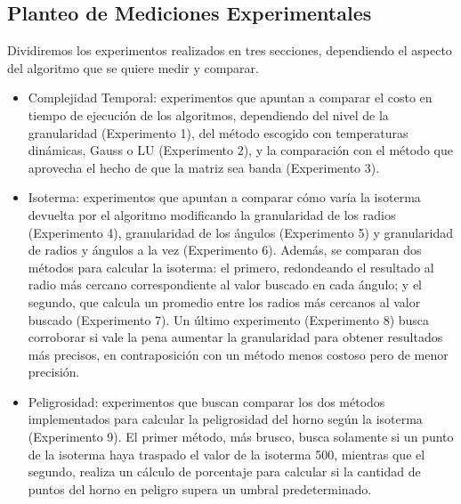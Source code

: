 \subsection{Planteo de Mediciones Experimentales}

\par Dividiremos los experimentos realizados en tres secciones, dependiendo el aspecto del algoritmo que se quiere medir y comparar.
\begin{itemize}


\item Complejidad Temporal: experimentos que apuntan a comparar el costo en tiempo de ejecución de los algoritmos, dependiendo del nivel de la granularidad (Experimento 1), del método escogido con temperaturas dinámicas, Gauss o LU (Experimento 2), y la comparación con el método que aprovecha el hecho de que la matriz sea banda (Experimento 3).
\item Isoterma: experimentos que apuntan a comparar cómo varía la isoterma devuelta por el algoritmo modificando la granularidad de los radios (Experimento 4), granularidad de los ángulos (Experimento 5) y granularidad de radios y ángulos a la vez (Experimento 6). Además, se comparan dos métodos para calcular la isoterma: el primero, redondeando el resultado al radio más cercano correspondiente al valor buscado en cada ángulo; y el segundo, que calcula un promedio entre los radios más cercanos al valor buscado (Experimento 7). Un último experimento (Experimento 8) busca corroborar si vale la pena aumentar la granularidad para obtener resultados más precisos, en contraposición con un método menos costoso pero de menor precisión.
\item Peligrosidad: experimentos que buscan comparar los dos métodos implementados para calcular la peligrosidad del horno según la isoterma (Experimento 9). El primer método, más brusco, busca solamente si un punto de la isoterma haya traspado el valor de la isoterma 500, mientras que el segundo, realiza un cálculo de porcentaje para calcular si la cantidad de puntos del horno en peligro supera un umbral predeterminado.
\end{itemize}

